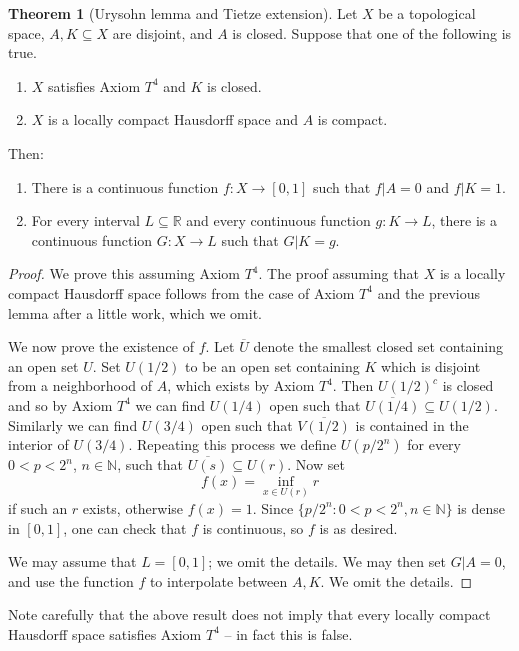 \documentclass[12pt]{book}
\newcommand{\NN}{\mathbb{N}}
\newcommand{\RR}{\mathbb{R}}
\theoremstyle{definition}
\newtheorem{theorem}{Theorem}[section]
\begin{document}
\begin{theorem}[Urysohn lemma and Tietze extension]
\label{Urysohn and Tietze}
Let $X$ be a topological space, $A, K \subseteq X$ are disjoint, and $A$ is closed. Suppose that one of the following is true.
\begin{enumerate}
\item $X$ satisfies Axiom $T^4$ and $K$ is closed.
\item $X$ is a locally compact Hausdorff space and $A$ is compact.
\end{enumerate}
Then:
\begin{enumerate}
\item There is a continuous function $f: X \to [0, 1]$ such that $f|A = 0$ and $f|K = 1$.
\item For every interval $L \subseteq \RR$ and every continuous function $g: K \to L$, there is a continuous function $G: X \to L$ such that $G|K = g$.
\end{enumerate}
\end{theorem}
\begin{proof}
We prove this assuming Axiom $T^4$. The proof assuming that $X$ is a locally compact Hausdorff space follows from the case of Axiom $T^4$ and the previous lemma after a little work, which we omit.

We now prove the existence of $f$.
Let $\overline U$ denote the smallest closed set containing an open set $U$.
Set $U(1/2)$ to be an open set containing $K$ which is disjoint from a neighborhood of $A$, which exists by Axiom $T^4$.
Then $U(1/2)^c$ is closed and so by Axiom $T^4$ we can find $U(1/4)$ open such that $\overline{U(1/4)} \subseteq U(1/2)$.
Similarly we can find $U(3/4)$ open such that $\overline{V(1/2)}$ is contained in the interior of $U(3/4)$.
Repeating this process we define $U(p/2^n)$ for every $0 < p < 2^n$, $n \in \NN$, such that $\overline{U(s)} \subseteq U(r)$.
Now set
$$f(x) = \inf_{x \in U(r)} r$$
if such an $r$ exists, otherwise $f(x) = 1$.
Since $\{p/2^n: 0 < p < 2^n, n \in \NN\}$ is dense in $[0, 1]$, one can check that $f$ is continuous, so $f$ is as desired.

We may assume that $L = [0, 1]$; we omit the details.
We may then set $G|A = 0$, and use the function $f$ to interpolate between $A,K$. We omit the details.
\end{proof}

Note carefully that the above result does not imply that every locally compact Hausdorff space satisfies Axiom $T^4$ -- in fact this is false.
\end{document}
